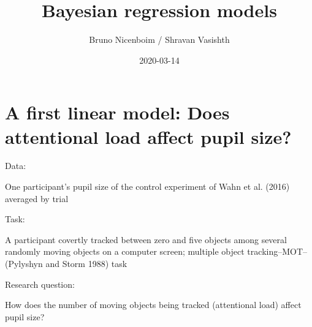 \documentclass[12pt,ignorenonframetext,aspectratio=169]{beamer}
\title{Bayesian regression models}
\author{Bruno Nicenboim / Shravan Vasishth}
\date{2020-03-14}
\begin{document}
\frame{\titlepage}

\begin{frame}
\tableofcontents[hideallsubsections]
\end{frame}
\hypertarget{sec:pupil}{%
\section{A first linear model: Does attentional load affect pupil size?}\label{sec:pupil}}

\small

\normalsize

\begin{frame}

\begin{block}{Data:}

One participant's pupil size of the control experiment of Wahn et al. (2016) averaged by trial

\end{block}

\begin{block}{Task:}

A participant covertly tracked between zero and five objects among several randomly moving objects on a computer screen; multiple object tracking--MOT-- (Pylyshyn and Storm 1988) task

\end{block}

\begin{block}{Research question:}

How does the number of moving objects being tracked (attentional load) affect pupil size?

\end{block}

\end{frame}
\end{document}
